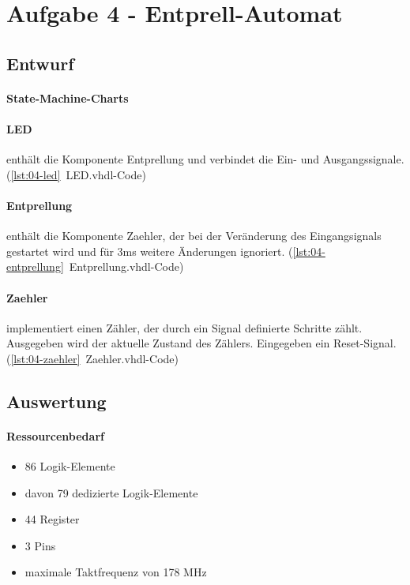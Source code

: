 \section{Aufgabe 4 - Entprell-Automat}
\subsection{Entwurf}
\paragraph{State-Machine-Charts}

\paragraph{LED} enthält die Komponente Entprellung und verbindet die Ein- und Ausgangssignale. (\ref{lst:04-led}~LED.vhdl-Code) 

\paragraph{Entprellung} enthält die Komponente Zaehler, der bei der Veränderung des Eingangsignals gestartet wird und für 3ms weitere Änderungen ignoriert. (\ref{lst:04-entprellung}~Entprellung.vhdl-Code) 

\paragraph{Zaehler} implementiert einen Zähler, der durch ein Signal definierte Schritte zählt. Ausgegeben wird der aktuelle Zustand des Zählers. Eingegeben ein Reset-Signal. (\ref{lst:04-zaehler}~Zaehler.vhdl-Code) 


\subsection{Auswertung}
\paragraph{Ressourcenbedarf}
\begin{itemize} 
\item 86 Logik-Elemente
\item davon 79 dedizierte Logik-Elemente
\item 44 Register
\item 3 Pins 
\item maximale Taktfrequenz von 178 MHz
\end{itemize}

